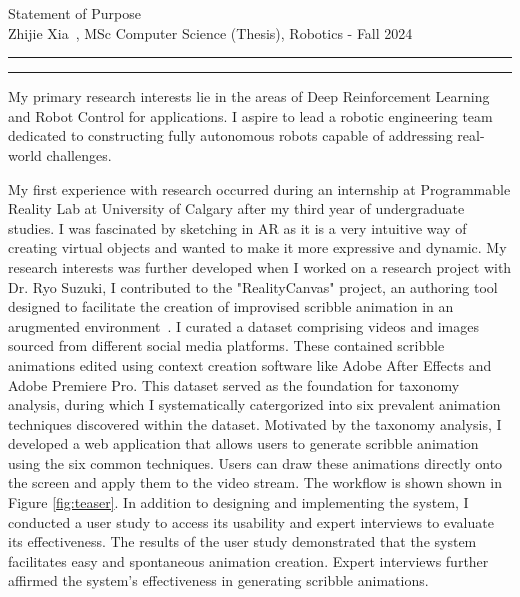 \documentclass{article}
\newcommand{\soptitle}{Statement of Purpose}
\newcommand{\yourname}{Zhijie Xia}
\begin{document}
\begin{center}\LARGE\soptitle\\
\large \yourname\ , MSc Computer Science (Thesis), Robotics - Fall 2024
\end{center}

\hrule
\vspace{1pt}
\hrule height 1pt

\bigskip

My primary research interests lie in the areas of Deep Reinforcement Learning and Robot Control for applications.
I aspire to lead a robotic engineering team dedicated to constructing fully autonomous robots capable of addressing
real-world challenges.

My first experience with research occurred during an internship at Programmable Reality Lab at University of Calgary 
after my third year of undergraduate studies. I was fascinated by sketching in AR as it is
a very intuitive way of creating virtual objects and wanted 
to make it more expressive and dynamic. 
My research interests was further developed when I worked on a research project with Dr. Ryo Suzuki, 
I contributed to the "RealityCanvas" project, an authoring tool designed to facilitate the creation
of improvised scribble animation in an arugmented environment~\cite{xia2023realitycanvas}.
I curated a dataset comprising videos and images sourced from different social media platforms.
These contained scribble animations edited using context creation software like Adobe After Effects and Adobe Premiere Pro. 
This dataset served as the foundation for taxonomy analysis, during which I systematically catergorized into 
six prevalent animation techniques discovered within the dataset. Motivated by the taxonomy analysis,
I developed a web application that allows users to generate scribble animation using the six common techniques. 
Users can draw these animations directly onto the screen and apply them to the video stream. The workflow 
is shown shown in Figure \ref{fig:teaser}. In addition to designing and implementing the system, I conducted a user study to access its usability and expert
interviews to evaluate its effectiveness. The results of the user study demonstrated that the system facilitates
easy and spontaneous animation creation. Expert interviews further affirmed the system's effectiveness in generating 
scribble animations.
\end{document}
